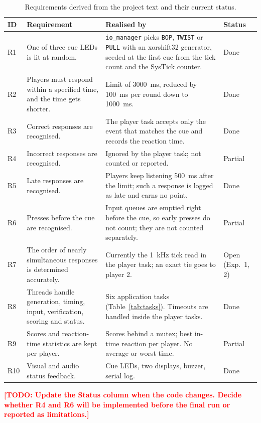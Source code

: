 \documentclass[11pt, a4paper]{article}
\newcommand{\todo}[1]{\textcolor{red}{\textbf{[TODO: #1]}}}
\begin{document}
\begin{table}[h]
    \centering
    \small
    \renewcommand{\arraystretch}{1.2}
    \begin{tabularx}{\textwidth}{@{}l>{\raggedright\arraybackslash}p{4.6cm}>{\raggedright\arraybackslash}X l@{}}
        \toprule
        \textbf{ID} & \textbf{Requirement} & \textbf{Realised by} & \textbf{Status} \\
        \midrule
        R1 & One of three cue LEDs is lit at random. & \texttt{io\_manager} picks \texttt{BOP}, \texttt{TWIST} or \texttt{PULL} with an xorshift32 generator, seeded at the first cue from the tick count and the SysTick counter. & Done \\
        R2 & Players must respond within a specified time, and the time gets shorter. & Limit of \SI{3000}{\milli\second}, reduced by \SI{100}{\milli\second} per round down to \SI{1000}{\milli\second}. & Done \\
        R3 & Correct responses are recognised. & The player task accepts only the event that matches the cue and records the reaction time. & Done \\
        R4 & Incorrect responses are recognised. & Ignored by the player task; not counted or reported. & Partial \\
        R5 & Late responses are recognised. & Players keep listening \SI{500}{\milli\second} after the limit; such a response is logged as late and earns no point. & Done \\
        R6 & Presses before the cue are recognised. & Input queues are emptied right before the cue, so early presses do not count; they are not counted separately. & Partial \\
        R7 & The order of nearly simultaneous responses is determined accurately. & Currently the \SI{1}{\kilo\hertz} tick read in the player task; an exact tie goes to player 2. & Open (Exp.~1, 2) \\
        R8 & Threads handle generation, timing, input, verification, scoring and status. & Six application tasks (Table~\ref{tab:tasks}). Timeouts are handled inside the player tasks. & Done \\
        R9 & Scores and reaction-time statistics are kept per player. & Scores behind a mutex; best in-time reaction per player. No average or worst time. & Partial \\
        R10 & Visual and audio status feedback. & Cue LEDs, two displays, buzzer, serial log. & Done \\
        \bottomrule
    \end{tabularx}
    \caption{Requirements derived from the project text and their current status.}
    \label{tab:requirements}
\end{table}
\todo{Update the Status column when the code changes. Decide whether R4 and R6 will be implemented before the final run or reported as limitations.}
\end{document}
